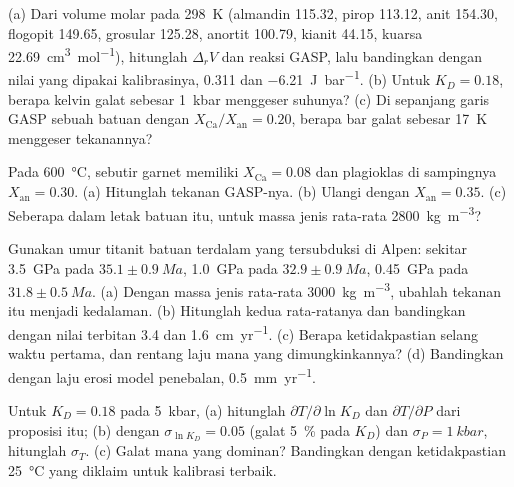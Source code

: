 \begin{exercise}[$\star\star$]\label{exo:b2:pt-paths:6}
(a) Dari volume molar pada \qty{298}{K} (almandin 115.32, pirop 113.12, anit
154.30, flogopit 149.65, grosular 125.28, anortit 100.79, kianit 44.15, kuarsa
\qty{22.69}{cm^3.mol^{-1}}), hitunglah $\Delta_r V$  dan reaksi
GASP, lalu bandingkan dengan nilai yang dipakai kalibrasinya, \num{0.311} dan
\qty{-6.21}{J.bar^{-1}}. (b) Untuk $K_D = 0.18$, berapa kelvin galat sebesar
\qty{1}{kbar} menggeser suhunya? (c) Di sepanjang garis GASP sebuah batuan dengan
$X_{\text{Ca}}/X_{\text{an}} = 0.20$, berapa bar galat sebesar \qty{17}{K} menggeser
tekanannya?
\end{exercise}

\begin{exercise}[$\star\star$]\label{exo:b2:pt-paths:7}
Pada \qty{600}{\celsius}, sebutir garnet memiliki $X_{\text{Ca}} = 0.08$ dan plagioklas di sampingnya
$X_{\text{an}} = 0.30$. (a) Hitunglah tekanan GASP-nya. (b) Ulangi dengan $X_{\text{an}} =
0.35$. (c) Seberapa dalam letak batuan itu, untuk massa jenis rata-rata \qty{2800}{kg.m^{-3}}?
\end{exercise}

\begin{exercise}[$\star\star$]\label{exo:b2:pt-paths:8}
Gunakan umur titanit batuan terdalam yang tersubduksi di Alpen: sekitar \qty{3.5}{GPa} pada
$35.1 \pm \qty{0.9}{Ma}$, \qty{1.0}{GPa} pada $32.9 \pm \qty{0.9}{Ma}$, \qty{0.45}{GPa} pada
$31.8 \pm \qty{0.5}{Ma}$. (a) Dengan massa jenis rata-rata \qty{3000}{kg.m^{-3}}, ubahlah
tekanan itu menjadi kedalaman. (b) Hitunglah kedua  rata-ratanya dan bandingkan dengan
nilai terbitan 3.4 dan \qty{1.6}{cm.yr^{-1}}. (c) Berapa ketidakpastian selang waktu
pertama, dan rentang laju mana yang dimungkinkannya? (d) Bandingkan dengan laju erosi
model penebalan, \qty{0.5}{mm.yr^{-1}}.
\end{exercise}

\begin{exercise}[$\star\star$]\label{exo:b2:pt-paths:9}
Untuk $K_D = 0.18$ pada \qty{5}{kbar}, (a) hitunglah $\partial T/\partial\ln K_D$ dan
$\partial T/\partial P$ dari proposisi itu; (b) dengan $\sigma_{\ln K_D} = 0.05$ (galat
\qty{5}{\percent} pada $K_D$) dan $\sigma_P = \qty{1}{kbar}$, hitunglah $\sigma_T$.
(c) Galat mana yang dominan? Bandingkan dengan ketidakpastian \qty{25}{\celsius} yang diklaim
untuk kalibrasi terbaik.
\end{exercise}

